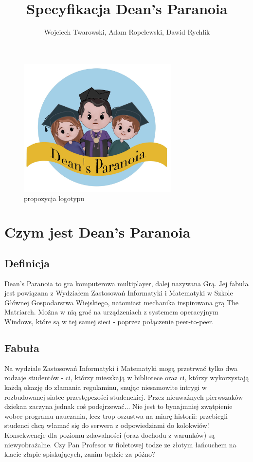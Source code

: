 \documentclass[]{report}
\title{Specyfikacja Dean's Paranoia}
\author{Wojciech Twarowski, Adam Ropelewski, Dawid Rychlik}
\begin{document}
\maketitle
\tableofcontents
\newpage

\begin{figure}[H]
	\centering
	\includegraphics[width=8cm]{Figures/paranoia.jpg}
	\caption{propozycja logotypu}
\end{figure}

\section{Czym jest Dean's Paranoia}

\subsection{Definicja}
Dean's Paranoia to gra komputerowa multiplayer, dalej nazywana Grą. Jej fabuła jest powiązana z Wydziałem Zastosowań Informatyki i Matematyki w Szkole Głównej Gospodarstwa Wiejskiego, natomiast mechanika inspirowana grą The Matriarch. Można w nią grać na urządzeniach z systemem operacyjnym Windows, które są w tej samej sieci - poprzez połączenie peer-to-peer.

\subsection{Fabuła}
Na wydziale Zastosowań Informatyki i Matematyki mogą przetrwać tylko dwa rodzaje studentów - ci, którzy mieszkają w bibliotece oraz ci, którzy wykorzystają każdą okazję do złamania regulaminu, snując niesamowite intrygi w rozbudowanej siatce przestępczości studenckiej. Przez nieuważnych pierwszaków dziekan zaczyna jednak coś podejrzewać... Nie jest to bynajmniej zwątpienie wobec programu nauczania, lecz trop oszustwa na miarę historii: przebiegli studenci chcą włamać się do serwera z odpowiedziami do kolokwiów! Konsekwencje dla poziomu zdawalności (oraz dochodu z warunków) są niewyobrażalne. Czy Pan Profesor w fioletowej todze ze złotym łańcuchem na klacie złapie spiskujących, zanim będzie za późno?
\end{document}
